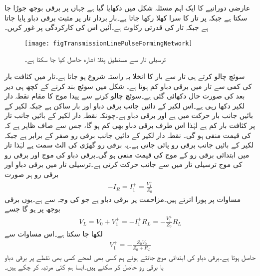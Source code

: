 عارضی دورانیے کا ایک اہم مسئلہ شکل  میں دکھایا گیا ہے جہاں  پر برقی بوجھ  جوڑا جا سکتا ہے جبکہ  پر تار کا سرا کھلا رکھا جاتا ہے۔بار بردار تار پر  مثبت برقی دباو پایا جاتا ہے جبکہ تار کی قدرتی رکاوٹ  ہے۔آئیں اس کی کارکردگی پر غور کریں۔  
\begin{figure}
\centering
\texttt{[image: figTransmissionLinePulseFormingNetwork]}
\caption{ترسیلی تار سے مستطیل پتلا اشارہ حاصل کیا جا سکتا ہے۔}
\label{شکل_ترسیلی_مستطیل_اشارہ}
\end{figure}
سوئچ چالو کرتے ہی تار سے  بار کا انخلا بہ راستہ  شروع ہو جاتا ہے۔تار میں کثافت بار کی کمی سے تار میں برقی دباو کم ہوتا ہے۔ شکل  میں سوئچ بند کرنے کے کچھ ہی دیر بعد کی صورت حال دکھائی گئی ہے۔سوئچ چالو کرنے سے پیدا موج کا مقام نقطہ دار لکیر  دکھا رہی ہے۔اس لکیر کے دائیں جانب برقی دباو  اور بار ساکن ہے جبکہ لکیر کے بائیں جانب بار حرکت میں ہے اور برقی دباو  ہے۔چونکہ نقطہ دار لکیر کے بائیں جانب تار پر کثافت بار کم ہے لہٰذا اس طرف برقی دباو بھی کم ہو گا، جس سے صاف ظاہر ہے کہ  کی قیمت منفی ہو گی۔ نقطہ دار لکیر کے دائیں جانب برقی رو صفر کے برابر ہے جبکہ لکیر کے بائیں جانب برقی رو پائی جاتی ہے۔یہ برقی رو گھڑی کی الٹ سمت ہے لہٰذا تار میں ابتدائی برقی رو کے موج  کی قیمت منفی ہو گی۔برقی دباو کی موج  اور برقی رو کی موج   ترسیلی تار میں  سے  جانب حرکت کرتی ہے۔ترسیلی تار میں برقی دباو اور برقی رو ہر صورت 
\begin{align*}
-I_R=I_1^+=\frac{V_1^+}{Z_0}
\end{align*}
مساوات پر پورا اترتے ہیں۔مزاحمت  پر برقی دباو  ہے جو  کی وجہ سے ہے۔یوں برقی بوجھ پر  ہو گا جسے
\begin{align*}
V_L=V_0 +V_1^+ =-I_1^+ R_L=-\frac{V_1^+}{Z_0} R_L
\end{align*}
لکھا جا سکتا ہے۔اس مساوات سے
\begin{align}\label{مساوات_ترسیلی_ابتدائی_برقی_مستطیل_اشارہ}
V_1^+=-\frac{Z_0 V_0}{Z_0+R_L}
\end{align}
حاصل ہوتا ہے۔برقی دباو کی ابتدائی موج جانتے ہوئے ہم کسی بھی لمحے کسی بھی نقطے پر برقی دباو یا برقی رو حاصل کر سکتے ہیں۔ایسا ہم کئی مرتبہ کر چکے ہیں۔

